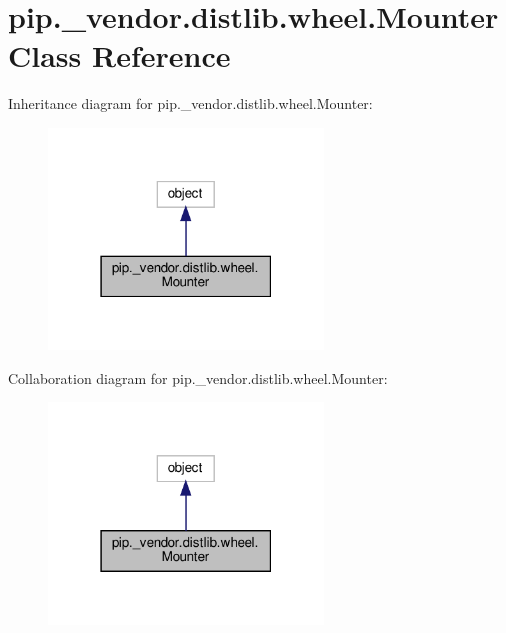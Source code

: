 \hypertarget{classpip_1_1__vendor_1_1distlib_1_1wheel_1_1Mounter}{}\section{pip.\+\_\+vendor.\+distlib.\+wheel.\+Mounter Class Reference}
\label{classpip_1_1__vendor_1_1distlib_1_1wheel_1_1Mounter}


Inheritance diagram for pip.\+\_\+vendor.\+distlib.\+wheel.\+Mounter\+:
\nopagebreak
\begin{figure}[H]
\begin{center}
\leavevmode
\includegraphics[width=207pt]{classpip_1_1__vendor_1_1distlib_1_1wheel_1_1Mounter__inherit__graph}
\end{center}
\end{figure}


Collaboration diagram for pip.\+\_\+vendor.\+distlib.\+wheel.\+Mounter\+:
\nopagebreak
\begin{figure}[H]
\begin{center}
\leavevmode
\includegraphics[width=207pt]{classpip_1_1__vendor_1_1distlib_1_1wheel_1_1Mounter__coll__graph}
\end{center}
\end{figure}

